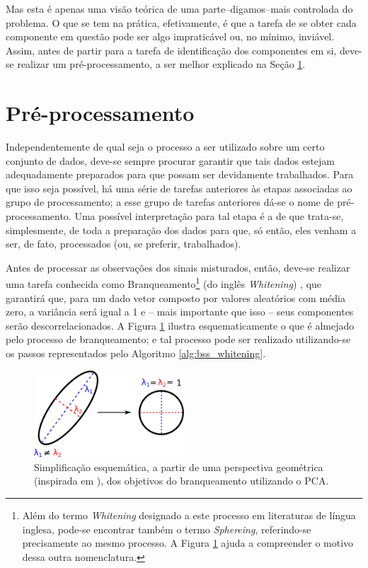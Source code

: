 Mas esta é apenas uma visão teórica de uma parte--digamos--mais controlada do problema. O que se tem na prática, efetivamente, é que a tarefa de se obter cada componente em questão pode ser algo impraticável ou, no mínimo, inviável. Assim, antes de partir para a tarefa de identificação dos componentes em si, deve-se realizar um pré-processamento, a ser melhor explicado na Seção \ref{sec:bss_preproc}.


\section{Pré-processamento}
\label{sec:bss_preproc}

Independentemente de qual seja o processo a ser utilizado sobre um certo conjunto de dados, deve-se sempre procurar garantir que tais dados estejam adequadamente preparados para que possam ser devidamente trabalhados. Para que isso seja possível, há uma série de tarefas anteriores às etapas associadas ao grupo de processamento; a esse grupo de tarefas anteriores dá-se o nome de pré-processamento. Uma possível interpretação para tal etapa é a de que trata-se, simplesmente, de toda a preparação dos dados para que, só então, eles venham a ser, de fato, processados (ou, se preferir, trabalhados).

Antes de processar as observações dos sinais misturados, então, deve-se realizar uma tarefa conhecida como Branqueamento\footnote{Além do termo \textit{Whitening} designado a este processo em literaturas de língua inglesa, pode-se encontrar também o termo \textit{Sphereing}, referindo-se precisamente ao mesmo processo. A Figura \ref{fig:bss_pca_whitening} ajuda a compreender o motivo dessa outra nomenclatura.} (do inglês \textit{Whitening}) \citep{BELL19973327, koivunen1999feasibility}, que garantirá que, para um dado vetor composto por valores aleatórios com média zero, a variância será igual a 1 e -- mais importante que isso -- seus componentes serão descorrelacionados. A Figura \ref{fig:bss_pca_whitening} ilustra esquematicamente o que é almejado pelo processo de branqueamento; e tal processo pode ser realizado utilizando-se os passos representados pelo Algoritmo \ref{alg:bss_whitening}.

\begin{figure}[H]
    \centering
    \includegraphics[width=0.5\textwidth]{figs/pca_whitening.pdf}
    \caption{Simplificação esquemática, a partir de uma perspectiva geométrica (inspirada em \citep{zafeiriou2015notes}), dos objetivos do branqueamento utilizando o PCA.}
    \label{fig:bss_pca_whitening}
\end{figure}




